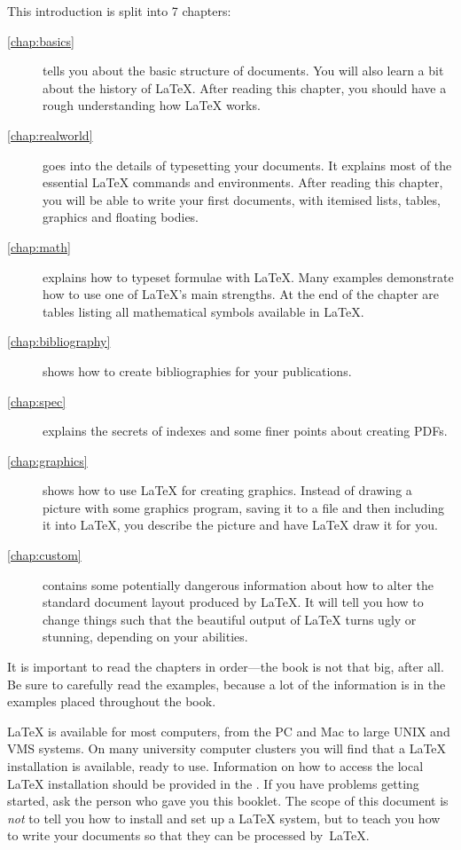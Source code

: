 \bigskip
\noindent This introduction is split into 7 chapters:
\begin{description}
  \item[\autoref{chap:basics}] tells you about the basic structure of
    \LaTeXe{} documents. You will also learn a bit about the history of
    \LaTeX{}. After reading this chapter, you should have a rough understanding
    how \LaTeX{} works.
  \item[\autoref{chap:realworld}] goes into the details of typesetting your
    documents. It explains most of the essential \LaTeX{} commands and
    environments. After reading this chapter, you will be able to write your
    first documents, with itemised lists, tables, graphics and floating bodies.
  \item[\autoref{chap:math}] explains how to typeset formulae with \LaTeX.
    Many examples demonstrate how to use one of \LaTeX{}'s main strengths. At
    the end of the chapter are tables listing all mathematical symbols
    available in \LaTeX{}.
  \item[\autoref{chap:bibliography}] shows how to create bibliographies for
    your publications.
  \item[\autoref{chap:spec}] explains the secrets of indexes and some finer
    points about creating PDFs.
  \item[\autoref{chap:graphics}] shows how to use \LaTeX{} for creating
    graphics. Instead of drawing a picture with some graphics program, saving
    it to a file and then including it into \LaTeX{}, you describe the picture
    and have \LaTeX{} draw it for you.
  \item[\autoref{chap:custom}] contains some potentially dangerous
    information about how to alter the standard document layout produced by
    \LaTeX{}. It will tell you how  to change things such that the beautiful
    output of \LaTeX{} turns ugly or stunning, depending on your abilities.
\end{description}
\bigskip
\noindent It is important to read the chapters in order---the book is
not that big, after all. Be sure to carefully read the examples,
because a lot of the information is in the
examples placed throughout the book.

\bigskip
\noindent \LaTeX{} is available for most computers, from the PC and Mac to large
UNIX and VMS systems. On many university computer clusters you will
find that a \LaTeX{} installation is available, ready to use.
Information on how to access
the local \LaTeX{} installation should be provided in the \guide. If
you have problems getting started, ask the person who gave you this
booklet. The scope of this document is \emph{not} to tell you how to
install and set up a \LaTeX{} system, but to teach you how to write
your documents so that they can be processed by~\LaTeX{}.

